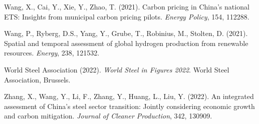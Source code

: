 \documentclass[preprint,1p,authoryear]{elsarticle}
\begin{document}
\begin{thebibliography}{99}
 Wang, X., Cai, Y., Xie, Y., Zhao, T. (2021). Carbon pricing in China's national ETS: Insights from municipal carbon pricing pilots. \textit{Energy Policy}, 154, 112288.

 Wang, P., Ryberg, D.S., Yang, Y., Grube, T., Robinius, M., Stolten, D. (2021). Spatial and temporal assessment of global hydrogen production from renewable resources. \textit{Energy}, 238, 121532.

 World Steel Association (2022). \textit{World Steel in Figures 2022}. World Steel Association, Brussels.

 Zhang, X., Wang, Y., Li, F., Zhang, Y., Huang, L., Liu, Y. (2022). An integrated assessment of China's steel sector transition: Jointly considering economic growth and carbon mitigation. \textit{Journal of Cleaner Production}, 342, 130909.
\end{thebibliography}
\end{document}
